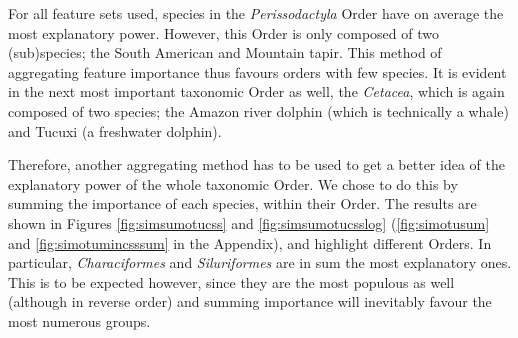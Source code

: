For all feature sets used, species in the \textit{Perissodactyla} Order have on average the most explanatory power. However, this Order is only composed of two (sub)species; the South American and Mountain tapir. This method of aggregating feature importance thus favours orders with few species. It is evident in the next most important taxonomic Order as well, the \textit{Cetacea}, which is again composed of two species; the Amazon river dolphin (which is technically a whale) and Tucuxi (a freshwater dolphin). 

Therefore, another aggregating method has to be used to get a better idea of the explanatory power of the whole taxonomic Order. We chose to do this by summing the importance of each species, within their Order. The results are shown in Figures \ref{fig:simsumotucss} and \ref{fig:simsumotucsslog} (\ref{fig:simotusum} and \ref{fig:simotumincsssum} in the Appendix), and highlight different Orders. In particular, \textit{Characiformes} and \textit{Siluriformes} are in sum the most explanatory ones. This is to be expected however, since they are the most populous as well (although in reverse order) and summing importance will inevitably favour the most numerous groups. 



